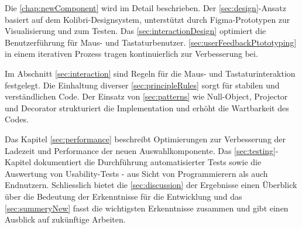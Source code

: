 Die \ref{chap:newComponent} wird im Detail beschrieben.
Der \ref{sec:design}-Ansatz basiert auf dem Kolibri-Designsystem, unterstützt durch Figma-Prototypen zur Visualisierung und zum Testen.
Das \ref{sec:interactionDesign} optimiert die Benutzerführung für Maus- und Tastaturbenutzer.
\ref{sec:userFeedbackPtototyping} in einem iterativen Prozess tragen kontinuierlich zur Verbesserung bei.

Im Abschnitt \ref{sec:interaction} sind Regeln für die Maus- und Tastaturinteraktion festgelegt.
Die Einhaltung diverser \ref{sec:principleRules} sorgt für stabilen und verständlichen Code.
Der Einsatz von \ref{sec:patterns} wie Null-Object, Projector und Decorator strukturiert die Implementation und erhöht die Wartbarkeit des Codes.

Das Kapitel \ref{sec:performance} beschreibt Optimierungen zur Verbesserung der Ladezeit und Performance der neuen Auswahlkomponente.
Das \ref{sec:testing}-Kapitel dokumentiert die Durchführung automatisierter Tests sowie die Auswertung von Usability-Tests - aus Sicht von Programmierern als auch Endnutzern.
Schliesslich bietet die \ref{sec:discussion} der Ergebnisse einen Überblick über die Bedeutung der Erkenntnisse für die Entwicklung 
und das \ref{sec:summeryNew} fasst die wichtigsten Erkenntnisse zusammen und gibt einen Ausblick auf zukünftige Arbeiten.
